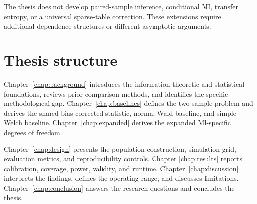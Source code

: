 The thesis does not develop paired-sample inference, conditional MI, transfer
entropy, or a universal sparse-table correction. These extensions require
additional dependence structures or different asymptotic arguments.

\section{Thesis structure}

Chapter~\ref{chap:background} introduces the information-theoretic and
statistical foundations, reviews prior comparison methods, and identifies the
specific methodological gap. Chapter~\ref{chap:baselines} defines the
two-sample problem and derives the shared bias-corrected statistic, normal Wald
baseline, and simple Welch baseline. Chapter~\ref{chap:expanded} derives the
expanded MI-specific degrees of freedom.

Chapter~\ref{chap:design} presents the population construction, simulation
grid, evaluation metrics, and reproducibility controls. Chapter
\ref{chap:results} reports calibration, coverage, power, validity, and runtime.
Chapter~\ref{chap:discussion} interprets the findings, defines the operating
range, and discusses limitations. Chapter~\ref{chap:conclusion} answers the
research questions and concludes the thesis.
